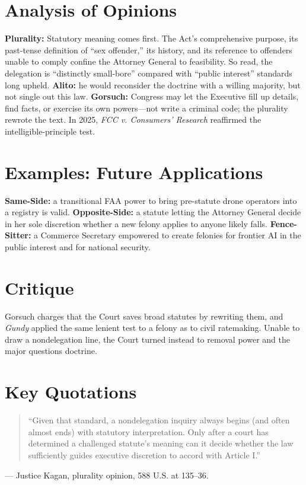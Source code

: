 \documentclass[12pt]{article}
\begin{document}
\section{Analysis of Opinions}
\textbf{Plurality:} Statutory meaning comes first. The Act's comprehensive purpose, its past-tense definition of ``sex offender,'' its history, and its reference to offenders unable to comply confine the Attorney General to feasibility. So read, the delegation is ``distinctly small-bore'' compared with ``public interest'' standards long upheld. \textbf{Alito:} he would reconsider the doctrine with a willing majority, but not single out this law. \textbf{Gorsuch:} Congress may let the Executive fill up details, find facts, or exercise its own powers---not write a criminal code; the plurality rewrote the text. In 2025, \textit{FCC v. Consumers' Research} reaffirmed the intelligible-principle test.

\section{Examples: Future Applications}
\textbf{Same-Side:} a transitional FAA power to bring pre-statute drone operators into a registry is valid. \textbf{Opposite-Side:} a statute letting the Attorney General decide in her sole discretion whether a new felony applies to anyone likely falls. \textbf{Fence-Sitter:} a Commerce Secretary empowered to create felonies for frontier AI in the public interest and for national security.

\section{Critique}
Gorsuch charges that the Court saves broad statutes by rewriting them, and \textit{Gundy} applied the same lenient test to a felony as to civil ratemaking. Unable to draw a nondelegation line, the Court turned instead to removal power and the major questions doctrine.

\section{Key Quotations}
\begin{quote}
``Given that standard, a nondelegation inquiry always begins (and often almost ends) with statutory interpretation. Only after a court has determined a challenged statute's meaning can it decide whether the law sufficiently guides executive discretion to accord with Article I.''
\end{quote}
\noindent --- Justice Kagan, plurality opinion, 588 U.S. at 135--36.
\end{document}
